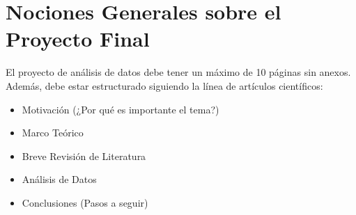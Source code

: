 \documentclass[letterpaper]{article}
\begin{document}
\section{Nociones Generales sobre el Proyecto Final}
El proyecto de análisis de datos debe tener un máximo de 10 páginas sin anexos. Además, debe estar estructurado siguiendo la línea de artículos científicos:
\begin{itemize}
\item Motivación (¿Por qué es importante el tema?)
\item Marco Teórico
\item Breve Revisión de Literatura
\item Análisis de Datos
\item Conclusiones (Pasos a seguir)

\end{itemize}
\end{document}
